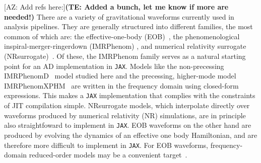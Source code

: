 \documentclass[twocolumn]{aastex631}
\newcommand{\jax}{\texttt{JAX}\xspace}
\newcommand{\te}[1]{\textbf{\color{pyGreen}(TE: #1)}}
\newcommand{\AZ}[1]{{\color{Burnt}[AZ: #1]}}
\begin{document}
\AZ{Add refs here:}\te{Added a bunch, let me know if more are needed!}
There are a variety of gravitational waveforms currently used in analysis pipelines.
They are generally structured into different families, the most common of which are: the effective-one-body (EOB)~\citep{Damour:2008yg,Buonanno:2005xu, Buonanno:2000ef, Buonanno:1998gg, Damour:2000we}, the phenomenological inspiral-merger-ringerdown (IMRPhenom) \citep{Husa:2015iqa,Khan:2015jqa,Hannam:2013oca,Pratten:2020ceb}, and numerical relativity surrogate (NRsurrogate)~\citep{Blackman:2017pcm,Varma:2018mmi,Varma:2019csw}.
Of these, the IMRPhenom family serves as a natural starting point for an AD implementation in \jax.
Models like the non-precessing IMRPhenomD~\citep{Khan:2015jqa} model studied here and the precessing, higher-mode model IMRPhenomXPHM~\citep{Pratten:2020fqn, Pratten:2020ceb} are written in the frequency domain using closed-form expressions.
This makes a
\jax implementation that complies with the constraints of JIT compilation simple.
NRsurrogate models, which interpolate directly over waveforms produced by numerical relativity (NR) simulations, are in principle also straightfoward to implement in \jax.
EOB waveforms on the other hand are produced by evolving the dynamics of an effective one body Hamiltonian, and are therefore more difficult to implement in \jax.
For EOB waveforms, frequency-domain reduced-order models may be a convenient target~\citep[e.g.][]{Cotesta:2020qhw}.
\end{document}
